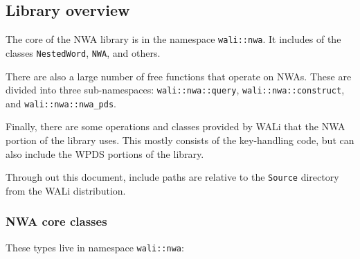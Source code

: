 \subsection{Library overview}

The core of the NWA library is in the namespace \texttt{wali::nwa}. It
includes of the classes \texttt{NestedWord}, \texttt{NWA}, and others.

There are also a large number of free functions that operate on NWAs. These
are divided into three sub-namespaces:
\texttt{wali::nwa::query}, \texttt{wali::nwa::construct}, and
\texttt{wali::nwa::nwa\_pds}.

Finally, there are some operations and classes provided by WALi that the NWA
portion of the library uses. This mostly consists of the key-handling code,
but can also include the WPDS portions of the library.

Through out this document, include paths are relative to the \texttt{Source}
directory from the WALi distribution.

\subsubsection{NWA core classes}

These types live in namespace \texttt{wali::nwa}:

